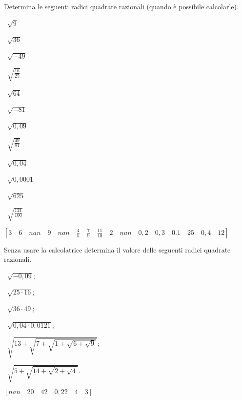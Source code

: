 \begin{esercizio}
 \label{ese:2.01}
Determina le seguenti radici quadrate razionali 
(quando è possibile calcolarle).
\vspace{-.7em}
\begin{multicols}{4}
 \begin{enumeratea}
 \item~$\sqrt 9$
 \item~$\sqrt{36}$
 \item~$\sqrt{-49}$
 \item~$\sqrt{\frac{16}{25}}$
 \item~$\sqrt{64}$
 \item~$\sqrt{-81}$
 \item~$\sqrt{0,09}$
 \item~$\sqrt{\frac{49}{81}}$
 \item~$\sqrt{0,04}$
 \item~$\sqrt{0,0001}$
 \item~$\sqrt{625}$
 \item~$\sqrt{\frac{121}{100}}$
 \end{enumeratea}
 \end{multicols}
\begin{flushright}
\vspace*{-8pt}
 $[3 \quad 6 \quad nan \quad 9 \quad nan \quad 
 \frac{4}{5} \quad \frac{7}{9} \quad \frac{11}{10} \quad 2 \quad 
 nan \quad 0,2 \quad 0,3 \quad 0.1 \quad 25 \quad 0,4 \quad 12]$
\end{flushright}
\vspace{-.7em}
\end{esercizio}

\newpage %

\begin{esercizio}
 \label{ese:2.02}
Senza usare la calcolatrice determina il valore delle seguenti radici 
quadrate razionali.
\vspace{-.7em}
\begin{multicols}{2}
 \begin{enumeratea}
 \item~$\sqrt{-0,09}$;
 \item~$\sqrt{25\cdot 16}$;
 \item~$\sqrt{36\cdot 49}$;
 \item~$\sqrt{0,04\cdot 0,0121}$;
 \item~$\sqrt{13+\sqrt{7+\sqrt{1+\sqrt{6+\sqrt 9}}}}$;
 \item~$\sqrt{5+\sqrt{14+\sqrt{2+\sqrt 4}}}$.
 \end{enumeratea}
 \end{multicols}
\begin{flushright}
\vspace*{-8pt}
$[nan \quad 20 \quad 42 \quad 0,22 \quad 4 \quad 3]$
\end{flushright}
\vspace{-.7em}
\end{esercizio}

